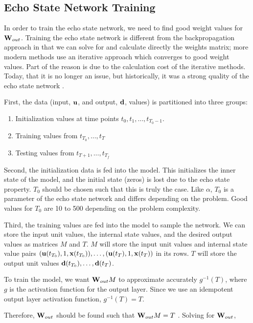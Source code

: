\documentclass{article}
\begin{document}
\subsection{Echo State Network Training}
\label{sec:etrain}

In order to train the echo state network, we need to find good weight values
for $\mathbf{W}_{out}$. Training the echo state network is different from the
backpropagation approach in that we can solve for and calculate directly the
weights matrix; more modern methods use an iterative approach which converges
to good weight values. Part of the reason is due to the calculation cost of
the iterative methods. Today, that it is no longer an issue, but
historically, it was a strong quality of the echo state network
\cite{jaeger2007echo}.

First, the data (input, $\mathbf{u}$, and output, $\mathbf{d}$, values) is partitioned into
three groups:
\begin{enumerate}
    \item Initialization values at time points
    $t_0, t_1, \dots, t_{T_0-1}$.
    \item Training values from
    $t_{T_0}, \dots, t_T$
    \item Testing values from
    $t_{T+1}, \dots, t_{T_f}$
\end{enumerate}

Second, the initialization data is fed into the model. This initializes the
inner state of the model, and the initial state (zeros) is lost due to the
echo state property. $T_0$ should be chosen such that this is truly the case.
Like $\alpha$, $T_0$ is a parameter of the echo state network and differs
depending on the problem. Good values for $T_0$ are 10 to 500 depending on
the problem complexity.

Third, the training values are fed into the model to sample the network. We
can store the input unit values, the internal state values, and the desired
output values as matrices $M$ and $T$. $M$ will store the input unit values
and internal state value pairs $(\mathbf{u}(t_{T_0}), 1, \mathbf{x}(t_{T_0})), \dots,
(\mathbf{u}(t_T), 1, \mathbf{x}(t_T))$ in its rows. $T$ will store the output unit values
$\mathbf{d}(t_{T_0}), \dots, \mathbf{d}(t_T)$.

To train the model, we want $\mathbf{W}_{out} M$ to approximate accurately $g^{-1}(T)$,
where $g$ is the activation function for the output layer. Since we use an
idempotent output layer activation function, $g^{-1}(T) = T$.

Therefore, $\mathbf{W}_{out}$ should be found such that $\mathbf{W}_{out} M = T$
\cite{jaeger2002tutorial}. Solving for $\mathbf{W}_{out}$,
\end{document}
